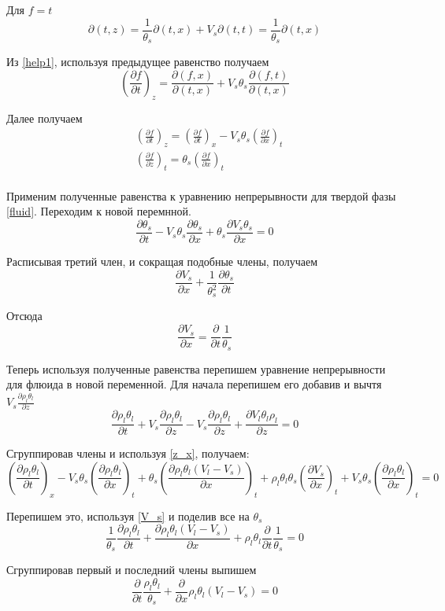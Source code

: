 \documentclass[12pt]{article}
\newcommand{\pd}[2]{\frac{\partial #1}{\partial #2}}
\begin{document}
Для $ f = t $ 
$$
\partial(t , z) = \frac{1}{\theta_s} \partial(t , x) + V_s \partial(t , t) = \frac{1}{\theta_s} \partial(t , x)
$$

Из \eqref{help1}, используя предыдущее равенство получаем
$$
\left(\pd{f}{t}\right)_z = \pd{(f , x)}{(t , x)} + V_s \theta_s\pd{(f ,t)}{(t , x)}
$$

Далее получаем
\begin{equation}
\begin{aligned}
&\left(\pd{f}{t}\right)_z = \left(\pd{f}{t}\right)_x - V_s\theta_s\left(\pd{f}{x}\right)_t\\
&\left(\pd{f}{z}\right)_t = \theta_s\left(\pd{f}{x}\right)_t\\
\end{aligned}
\label{z_x}
\end{equation}

Применим полученные равенства к уравнению непрерывности для твердой фазы \eqref{fluid}. Переходим к новой перемнной.
$$
\pd{\theta_s}{t} - V_s\theta_s\pd{\theta_s}{x} + \theta_s\pd{V_s\theta_s}{x} =0
$$

Расписывая третий член, и сокращая подобные члены, получаем
$$
\pd{V_s}{x} + \frac{1}{\theta_s^2}\pd{\theta_s}{t}
$$

Отсюда
\begin{equation}
\pd{V_s}{x} = \pd{}{t}\frac{1}{\theta_s}
\label{V_s}
\end{equation}

Теперь используя полученные равенства перепишем уравнение непрерывности для флюида в новой переменной. Для начала перепишем его добавив и вычтя $V_s\pd{\rho_l\theta_l}{z} $
$$
\pd{\rho_l\theta_l}{t} + V_s\pd{\rho_l\theta_l}{z} - V_s\pd{\rho_l\theta_l}{z} + \pd{V_l\theta_l\rho_l}{z} =0
$$

Сгруппировав члены и используя \eqref{z_x}, получаем:
$$
\left(\pd{\rho_l\theta_l}{t}\right)_x - V_s\theta_s \left(\pd{\rho_l\theta_l}{x}\right)_t + \theta_s\left(\pd{\rho_l\theta_l(V_l - V_s)}{x}\right)_t + \rho_l\theta_l\theta_s\left(\pd{V_s}{x}\right)_t + V_s\theta_s \left(\pd{\rho_l\theta_l}{x}\right)_t = 0
$$

Перепишем это, используя \eqref{V_s} и поделив все на $\theta_s$
$$
\frac{1}{\theta_s}\pd{\rho_l\theta_l}{t} + \pd{\rho_l\theta_l(V_l-V_s)}{x} + \rho_l\theta_l\pd{}{t}\frac{1}{\theta_s} = 0
$$

Сгруппировав первый и последний члены выпишем
\begin{equation}
\pd{}{t}\frac{\rho_l\theta_l}{\theta_s} + \pd{}{x}\rho_l\theta_l(V_l - V_s) = 0
\label{filtr_compr}
\end{equation}
\end{document}
